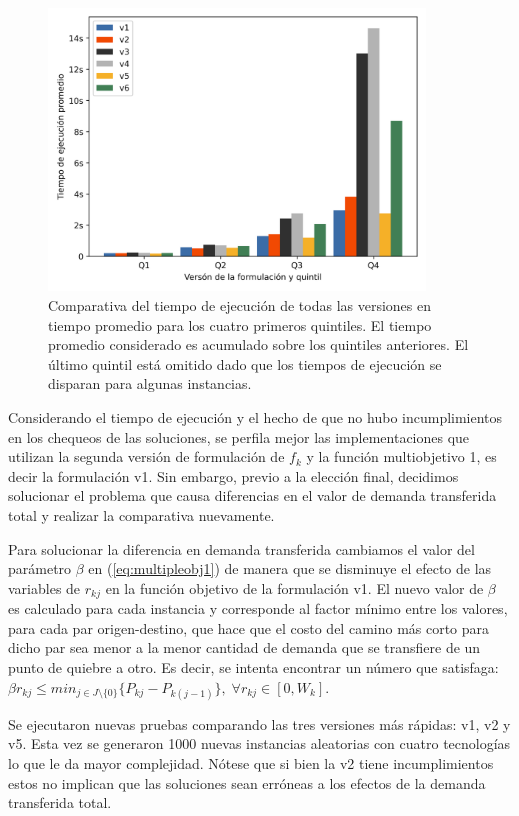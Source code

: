 \begin{figure}[h!]
  \centering
  \includegraphics[width=10cm]{../resources/run_time_comparsion_by_quintile.png}
    \caption{Comparativa del tiempo de ejecución de todas las versiones en tiempo promedio para los cuatro primeros quintiles. El tiempo promedio considerado es acumulado sobre los quintiles anteriores. El último quintil está omitido dado que los tiempos de ejecución se disparan para algunas instancias.}
  \label{fig:firstfourquintiles}
\end{figure}

Considerando el tiempo de ejecución y el hecho de que no hubo incumplimientos en los chequeos de las soluciones, se perfila mejor las implementaciones que utilizan la segunda versión de formulación de $f_k$ y la función multiobjetivo 1, es decir la formulación v1. Sin embargo, previo a la elección final, decidimos solucionar el problema que causa diferencias en el valor de demanda transferida total y realizar la comparativa nuevamente.

Para solucionar la diferencia en demanda transferida cambiamos el valor del parámetro $\beta$ en (\ref{eq:multipleobj1}) de manera que se disminuye el efecto de las variables de $r_{kj}$ en la función objetivo de la formulación v1. El nuevo valor de $\beta$ es calculado para cada instancia y corresponde al factor mínimo entre los valores, para cada par origen-destino, que hace que el costo del camino más corto para dicho par sea menor a la menor cantidad de demanda que se transfiere de un punto de quiebre a otro. Es decir, se intenta encontrar un número que satisfaga: $\beta r_{kj} \leq min_{j \in J \setminus \{0\}} \{ P_{kj} - P_{k(j-1)} \},\; \forall r_{kj} \in [0, W_k]$.

Se ejecutaron nuevas pruebas comparando las tres versiones más rápidas: v1, v2 y v5. Esta vez se generaron 1000 nuevas instancias aleatorias con cuatro tecnologías lo que le da mayor complejidad. Nótese que si bien la v2 tiene incumplimientos estos no implican que las soluciones sean erróneas a los efectos de la demanda transferida total.

